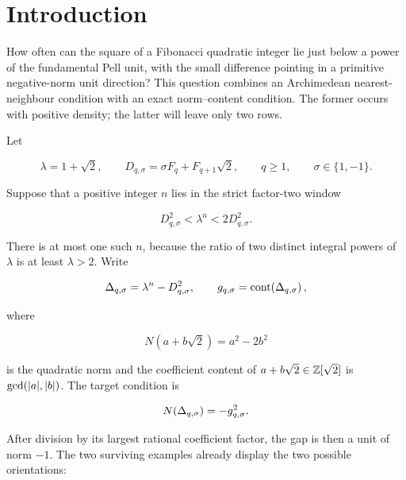 %
%
\section{Introduction}
\label{sec:introduction}

How often can the square of a Fibonacci quadratic integer lie just below a
power of the fundamental Pell unit, with the small difference pointing in a
primitive negative-norm unit direction? This question combines an
Archimedean nearest-neighbour condition with an exact norm--content condition.
The former occurs with positive density; the latter will leave only two
rows.

Let

\begin{equation}
 \lambda=1+\sqrt2,
 \qquad
 D_{q,\sigma}=\sigma F_q+F_{q+1}\sqrt2,
 \qquad
 q\geqslant1,
 \qquad
 \sigma\in\{1,-1\}.
 \label{eq:intro-D}
\end{equation}

Suppose that a positive integer $n$ lies in the strict factor-two window

\begin{equation}
 D_{q,\sigma}^2<\lambda^n<2D_{q,\sigma}^2.
 \label{eq:intro-window}
\end{equation}

There is at most one such $n$, because the ratio of two distinct integral
powers of $\lambda$ is at least $\lambda>2$. Write

\begin{equation}
 \Delta_{q,\sigma}=\lambda^n-D_{q,\sigma}^2,
 \qquad
 g_{q,\sigma}=\operatorname{cont}\!\left(\Delta_{q,\sigma}\right),
 \label{eq:intro-gap}
\end{equation}

where

\[
 N(a+b\sqrt2)=a^2-2b^2
\]

is the quadratic norm and the coefficient content of
$a+b\sqrt2\in\mathbb{Z}[\sqrt2]$ is $\gcd(\lvert a\rvert,\lvert b\rvert)$. The target condition is

\begin{equation}
 N\!\left(\Delta_{q,\sigma}\right)=-g_{q,\sigma}^2.
 \label{eq:intro-target}
\end{equation}

After division by its largest rational coefficient factor, the gap is then
a unit of norm $-1$. The two surviving examples already display the two possible
orientations:

